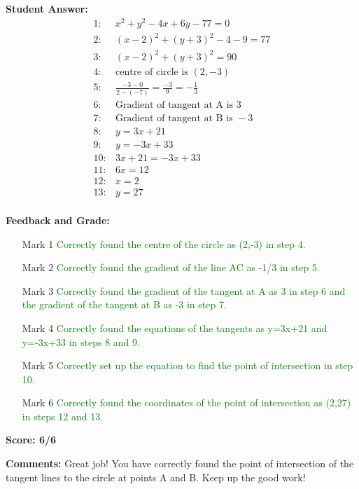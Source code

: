 \documentclass{article}
\begin{document}
\textbf{Student Answer:}
\begin{align*}
1: & x^{2}+y^{2}-4x+6y-77=0 \\
2: & (x-2)^{2}+(y+3)^{2}-4-9=77 \\
3: & (x-2)^{2}+(y+3)^{2}=90 \\
4: & \text{centre of circle is }(2,-3) \\
5: & \frac{-3-0}{2-(-7)}=\frac{-3}{9}=-\frac{1}{3} \\
6: & \text{Gradient of tangent at A is } 3 \\
7: & \text{Gradient of tangent at B is } -3 \\
8: & y=3x+21 \\
9: & y=-3x+33 \\
10: & 3x+21=-3x+33 \\
11: & 6x=12 \\
12: & x=2 \\
13: & y=27 \\
\end{align*}

\textbf{Feedback and Grade:}
\begin{itemize}
\item[Mark 1] \textcolor{green}{Correctly found the centre of the circle as (2,-3) in step 4.}
\item[Mark 2] \textcolor{green}{Correctly found the gradient of the line AC as -1/3 in step 5.}
\item[Mark 3] \textcolor{green}{Correctly found the gradient of the tangent at A as 3 in step 6 and the gradient of the tangent at B as -3 in step 7.}
\item[Mark 4] \textcolor{green}{Correctly found the equations of the tangents as y=3x+21 and y=-3x+33 in steps 8 and 9.}
\item[Mark 5] \textcolor{green}{Correctly set up the equation to find the point of intersection in step 10.}
\item[Mark 6] \textcolor{green}{Correctly found the coordinates of the point of intersection as (2,27) in steps 12 and 13.}
\end{itemize}

\textbf{Score: 6/6}

\textbf{Comments:} Great job! You have correctly found the point of intersection of the tangent lines to the circle at points A and B. Keep up the good work!
\end{document}
